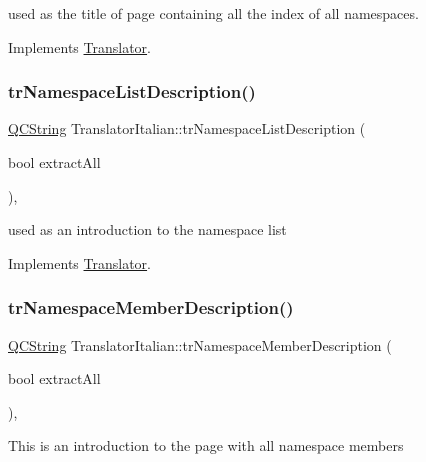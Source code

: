 used as the title of page containing all the index of all namespaces. 

Implements \mbox{\hyperlink{class_translator}{Translator}}.

\mbox{\label{class_translator_italian_afbe98c322ec04c2abeb7f6285a5820ea}} 
\subsubsection{\texorpdfstring{trNamespaceListDescription()}{trNamespaceListDescription()}}
{\footnotesize\ttfamily \mbox{\hyperlink{class_q_c_string}{Q\+C\+String}} Translator\+Italian\+::tr\+Namespace\+List\+Description (\begin{DoxyParamCaption}\item[{bool}]{extract\+All }\end{DoxyParamCaption})\hspace{0.3cm}{\ttfamily [inline]}, {\ttfamily [virtual]}}

used as an introduction to the namespace list 

Implements \mbox{\hyperlink{class_translator}{Translator}}.

\mbox{\label{class_translator_italian_a89ba92afb6cb2b170b772ff328f848f8}} 
\subsubsection{\texorpdfstring{trNamespaceMemberDescription()}{trNamespaceMemberDescription()}}
{\footnotesize\ttfamily \mbox{\hyperlink{class_q_c_string}{Q\+C\+String}} Translator\+Italian\+::tr\+Namespace\+Member\+Description (\begin{DoxyParamCaption}\item[{bool}]{extract\+All }\end{DoxyParamCaption})\hspace{0.3cm}{\ttfamily [inline]}, {\ttfamily [virtual]}}

This is an introduction to the page with all namespace members 

